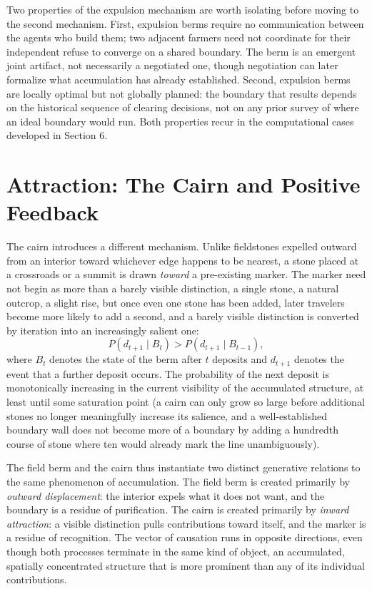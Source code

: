 \documentclass[11pt]{article}
\begin{document}
Two properties of the expulsion mechanism are worth isolating before moving to the second mechanism. First, expulsion berms require no communication between the agents who build them; two adjacent farmers need not coordinate for their independent refuse to converge on a shared boundary. The berm is an emergent joint artifact, not necessarily a negotiated one, though negotiation can later formalize what accumulation has already established. Second, expulsion berms are locally optimal but not globally planned: the boundary that results depends on the historical sequence of clearing decisions, not on any prior survey of where an ideal boundary would run. Both properties recur in the computational cases developed in Section 6.

\section{Attraction: The Cairn and Positive Feedback}

The cairn introduces a different mechanism. Unlike fieldstones expelled outward from an interior toward whichever edge happens to be nearest, a stone placed at a crossroads or a summit is drawn \emph{toward} a pre-existing marker. The marker need not begin as more than a barely visible distinction, a single stone, a natural outcrop, a slight rise, but once even one stone has been added, later travelers become more likely to add a second, and a barely visible distinction is converted by iteration into an increasingly salient one:
\[
P(d_{t+1}\mid B_t)
>
P(d_{t+1}\mid B_{t-1}),
\]
where $B_t$ denotes the state of the berm after $t$ deposits and $d_{t+1}$ denotes the event that a further deposit occurs. The probability of the next deposit is monotonically increasing in the current visibility of the accumulated structure, at least until some saturation point (a cairn can only grow so large before additional stones no longer meaningfully increase its salience, and a well-established boundary wall does not become more of a boundary by adding a hundredth course of stone where ten would already mark the line unambiguously).

The field berm and the cairn thus instantiate two distinct generative relations to the same phenomenon of accumulation. The field berm is created primarily by \emph{outward displacement}: the interior expels what it does not want, and the boundary is a residue of purification. The cairn is created primarily by \emph{inward attraction}: a visible distinction pulls contributions toward itself, and the marker is a residue of recognition. The vector of causation runs in opposite directions, even though both processes terminate in the same kind of object, an accumulated, spatially concentrated structure that is more prominent than any of its individual contributions.
\end{document}
